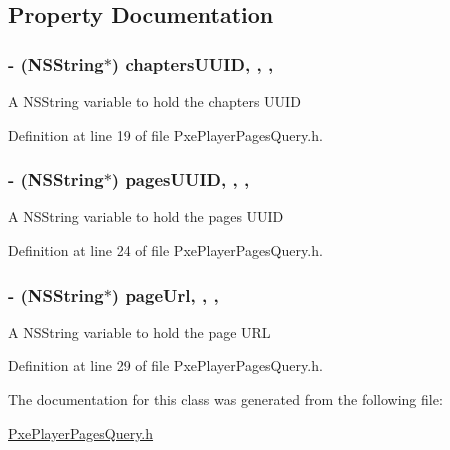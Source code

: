 \subsection{Property Documentation}
\hypertarget{interface_pxe_player_pages_query_a4c1b814264358230513c88452cb38988}{
\subsubsection[{chapters\-U\-U\-I\-D}]{\setlength{\rightskip}{0pt plus 5cm}-\/ (N\-S\-String$\ast$) chapters\-U\-U\-I\-D\hspace{0.3cm}{\ttfamily [read]}, {\ttfamily [write]}, {\ttfamily [nonatomic]}, {\ttfamily [strong]}}}\label{interface_pxe_player_pages_query_a4c1b814264358230513c88452cb38988}
A N\-S\-String variable to hold the chapters U\-U\-I\-D 

Definition at line 19 of file Pxe\-Player\-Pages\-Query.\-h.

\hypertarget{interface_pxe_player_pages_query_ad71c0d1369eccd8cde9d71afe70d6990}{
\subsubsection[{pages\-U\-U\-I\-D}]{\setlength{\rightskip}{0pt plus 5cm}-\/ (N\-S\-String$\ast$) pages\-U\-U\-I\-D\hspace{0.3cm}{\ttfamily [read]}, {\ttfamily [write]}, {\ttfamily [nonatomic]}, {\ttfamily [strong]}}}\label{interface_pxe_player_pages_query_ad71c0d1369eccd8cde9d71afe70d6990}
A N\-S\-String variable to hold the pages U\-U\-I\-D 

Definition at line 24 of file Pxe\-Player\-Pages\-Query.\-h.

\hypertarget{interface_pxe_player_pages_query_ad20152232423918df95d9c737139c545}{
\subsubsection[{page\-Url}]{\setlength{\rightskip}{0pt plus 5cm}-\/ (N\-S\-String$\ast$) page\-Url\hspace{0.3cm}{\ttfamily [read]}, {\ttfamily [write]}, {\ttfamily [nonatomic]}, {\ttfamily [strong]}}}\label{interface_pxe_player_pages_query_ad20152232423918df95d9c737139c545}
A N\-S\-String variable to hold the page U\-R\-L 

Definition at line 29 of file Pxe\-Player\-Pages\-Query.\-h.



The documentation for this class was generated from the following file\-:\begin{DoxyCompactItemize}
\item 
\hyperlink{_pxe_player_pages_query_8h}{Pxe\-Player\-Pages\-Query.\-h}\end{DoxyCompactItemize}
